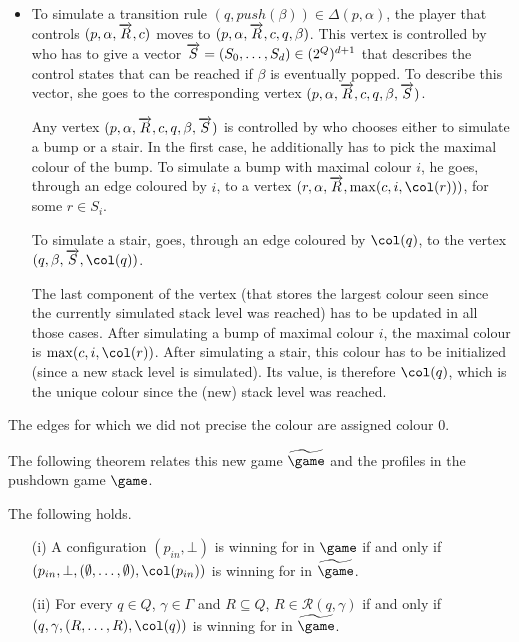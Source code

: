 \begin{itemize}
\item To simulate a transition rule
  $(q,push(\beta))\in\Delta(p,\alpha)$, the player that controls
  $(p,\alpha,\overrightarrow{R},c)$ moves to
  $(p,\alpha,\overrightarrow{R},c,q,\beta)$. This vertex is
  controlled by \Eve who has to give a vector
$\overrightarrow{S}=(S_0,\dots,S_d)\in
(2^Q)^{d+1}$ that describes the control states that can be
  reached if $\beta$ is eventually popped. To describe this vector,
  she goes to the corresponding vertex $(p,\alpha,\overrightarrow{R},c,q,\beta,\overrightarrow{S})$.

Any vertex $(p,\alpha,\overrightarrow{R},c,q,\beta,\overrightarrow{S})$ is
controlled by \Adam who chooses either to simulate a bump or a
stair. In the first case, he additionally has to pick the maximal colour of the
bump. To simulate a bump with maximal
colour $i$, he goes, through an edge coloured by $i$, to a vertex
$(r,\alpha,\vect{R},\max(c,i,\pdscol{r}))$, for some $r\in
S_i$.

To simulate a stair, \Adam goes, through an edge coloured by $\pdscol{q}$, to the vertex
$(q,\beta,\vect{S},\pdscol{q})$.

The last component of the vertex (that stores the
largest colour seen since the currently simulated stack level was
reached) has to be updated in all those cases. After simulating a bump
of maximal colour $i$, the maximal colour is
$\max(c,i,\pdscol{r})$. After simulating a stair, this colour has to
be initialized (since a new stack level is simulated). Its value, is
therefore $\pdscol{q}$, which is the unique colour since the (new) stack
level was reached.

\end{itemize}

The edges for which we did not precise the colour are assigned colour $0$.



The following theorem relates this new game $\fgame$ and the profiles in the pushdown game $\game$.

\begin{theorem}\label{10-thm:games}
The following holds.
\begin{enumerate}
\item[(i)] A configuration $(p_{in},\bot)$ is winning for \Eve in $\game$
if and only if
$(p_{in},\bot,(\emptyset,\dots,\emptyset),\pdscol{p_{in}})$
is winning for \Eve in
$\fgame$.

\item[(ii)] For every $q\in Q$, $\gamma\in\Gamma$ and $R\subseteq Q$, $R\in\mathcal{R}(q,\gamma)$ if and only if
$(q,\gamma,(R,\dots,R),\pdscol{q})$
is winning for \Eve in
$\fgame$.
\end{enumerate}
\end{theorem}

